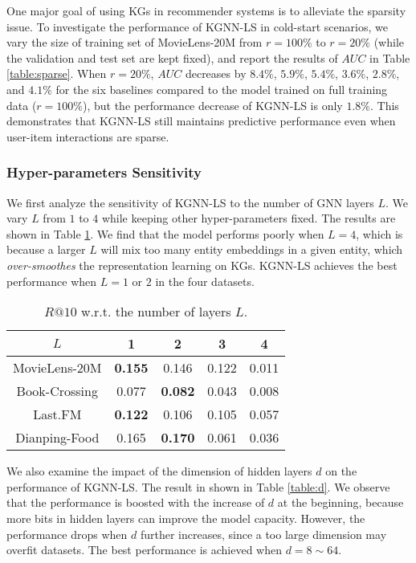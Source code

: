 \documentclass[sigconf]{acmart}
\begin{document}
			One major goal of using KGs in recommender systems is to alleviate the sparsity issue.
			To investigate the performance of KGNN-LS in cold-start scenarios, we vary the size of training set of MovieLens-20M from $r=100\%$ to $r=20\%$ (while the validation and test set are kept fixed), and report the results of $AUC$ in Table \ref{table:sparse}.
			When $r=20\%$, $AUC$ decreases by $8.4\%$, $5.9\%$, $5.4\%$, $3.6\%$, $2.8\%$, and $4.1\%$ for the six baselines compared to the model trained on full training data ($r=100\%$), but the performance decrease of KGNN-LS is only $1.8\%$.
			This demonstrates that KGNN-LS still maintains predictive performance even when user-item interactions are sparse.
			
			
		\subsubsection{Hyper-parameters Sensitivity}
			We first analyze the sensitivity of KGNN-LS to the number of GNN layers $L$.
			We vary $L$ from $1$ to $4$ while keeping other hyper-parameters fixed.
			The results are shown in Table \ref{table:L}.
			We find that the model performs poorly when $L=4$, which is because a larger $L$ will mix too many entity embeddings in a given entity, which \textit{over-smoothes} the representation learning on KGs.
			KGNN-LS achieves the best performance when $L = 1$ or $2$ in the four datasets.
			
			\begin{table}[t]
				\centering
				\setlength{\tabcolsep}{8pt}
				\begin{tabular}{c|cccc}
					\hline
					$L$ & 1 & 2 & 3 & 4\\
					\hline
					MovieLens-20M & \textbf{0.155} & 0.146 & 0.122 & 0.011 \\
					Book-Crossing & 0.077 & \textbf{0.082} & 0.043 & 0.008 \\
					Last.FM & \textbf{0.122} & 0.106 & 0.105 & 0.057 \\
					Dianping-Food & 0.165 & \textbf{0.170} & 0.061 & 0.036 \\
					\hline
				\end{tabular}
				\vspace{0.05in}
				\caption{$R@10$ w.r.t. the number of layers $L$.}
				\label{table:L}
				\vspace{-0.2in}
			\end{table}
			
			We also examine the impact of the dimension of hidden layers $d$ on the performance of KGNN-LS.
			The result in shown in Table \ref{table:d}.
			We observe that the performance is boosted with the increase of $d$ at the beginning, because more bits in hidden layers can improve the model capacity.
			However, the performance drops when $d$ further increases, since a too large dimension may overfit datasets.
			The best performance is achieved when $d = 8 \sim 64$.
			
\end{document}
